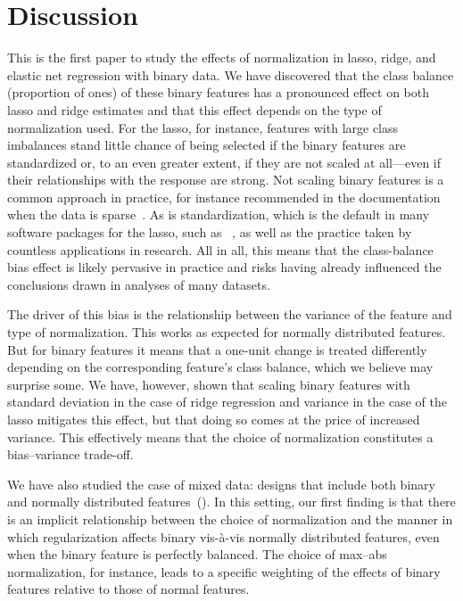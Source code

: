 \section{Discussion}


This is the first paper to study the effects of normalization in lasso, ridge, and elastic
net regression with binary data. We have discovered that the class balance (proportion of
ones) of these binary features has a pronounced effect on both lasso and ridge estimates
and that this effect depends on the type of normalization used. For the lasso, for
instance, features with large class imbalances stand little chance of being selected if the
binary features are standardized or, to an even greater extent, if they are not scaled at
all---even if their relationships with the response are strong. Not scaling binary features
is a common approach in practice, for instance recommended in the 
documentation when the data is sparse~\citep{scikit-learndevelopers2025}. As is
standardization, which is the default in many software packages for the lasso, such as
~\citep{friedman2010}, as well as the practice taken by countless applications
in research. All in all, this means that the class-balance bias effect is likely pervasive
in practice and risks having already influenced the conclusions drawn in analyses of many
datasets.

The driver of this bias is the relationship between the variance of the feature and type of
normalization. This works as expected for normally distributed features. But for binary
features it means that a one-unit change is treated differently depending on the
corresponding feature's class balance, which we believe may surprise some. We have,
however, shown that scaling binary features with standard deviation in the case of ridge
regression and variance in the case of the lasso mitigates this effect, but that doing so
comes at the price of increased variance. This effectively means that the choice of
normalization constitutes a bias--variance trade-off.

We have also studied the case of mixed data: designs that include both binary and normally
distributed features~(). In this setting, our first finding is that
there is an implicit relationship between the choice of normalization and the manner in
which regularization affects binary vis-à-vis normally distributed features, even when the
binary feature is perfectly balanced. The choice of max--abs normalization, for instance,
leads to a specific weighting of the effects of binary features relative to those of normal
features.

